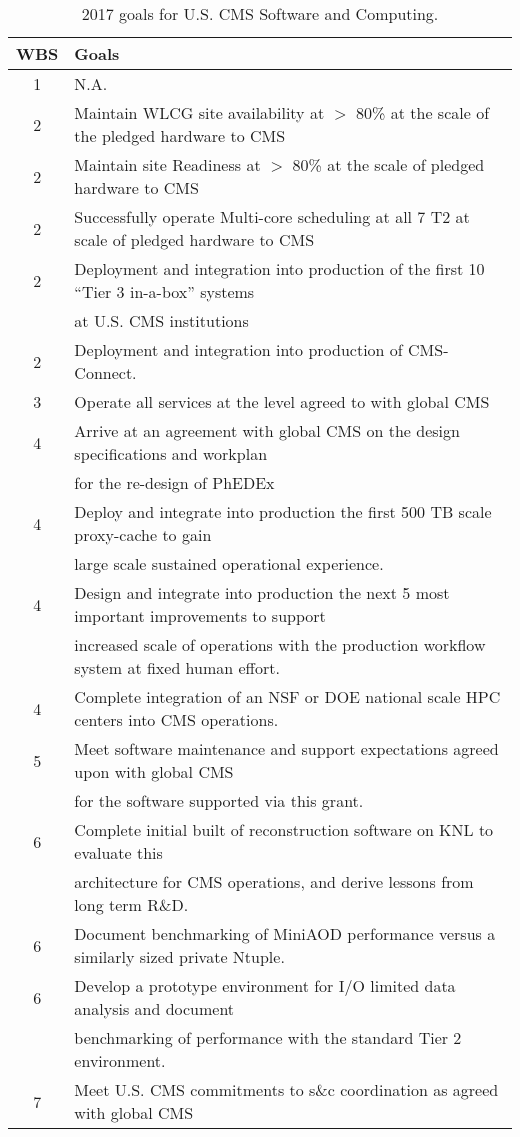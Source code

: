 \documentclass[11pt,a4paper]{article}
\begin{document}
\begin{table}
\begin{center}
\begin{tabular}{|c|l|}
\hline
WBS & Goals \\\hline
1 & N.A. \\
2 & Maintain WLCG site availability at $>$ 80\% at the scale of the pledged hardware to CMS\\
2 & Maintain site Readiness at $>$ 80\% at the scale of pledged hardware to CMS\\
2 & Successfully operate Multi-core scheduling at all 7 T2 at scale of pledged hardware to CMS\\
2 & Deployment and integration into production of the first 10 ``Tier 3 in-a-box'' systems\\
    & at U.S. CMS institutions\\
2 & Deployment and integration into production of CMS-Connect.\\
3 & Operate all services at the level agreed to with global CMS\\
4 & Arrive at an agreement with global CMS on the design specifications and workplan \\
    & for the re-design of PhEDEx\\
4 & Deploy and integrate into production the first 500 TB scale proxy-cache to gain \\
   & large scale sustained operational experience.\\
4 & Design and integrate into production the next 5 most important improvements to support \\
    & increased scale of operations with the production workflow system at fixed human effort.\\
4 & Complete integration of an NSF or DOE national scale HPC centers into CMS operations.\\ 
5 & Meet software maintenance and support expectations agreed upon with global CMS \\
    & for the software supported via this grant.\\
6 & Complete initial built of reconstruction software on KNL to evaluate this \\ 
    & architecture for CMS operations, and derive lessons from long term R\&D.\\
6 & Document benchmarking of MiniAOD performance versus a similarly sized private Ntuple.\\
6 & Develop a prototype environment for I/O limited data analysis and document \\
    & benchmarking of performance with the standard Tier 2 environment.\\
7 & Meet U.S. CMS commitments to s\&c coordination as agreed with global CMS\\\hline
\end{tabular}
\caption[]
{
2017 goals for U.S. CMS Software and Computing.
}
\label{scgoals}
\end{center}
\end{table}
\end{document}
